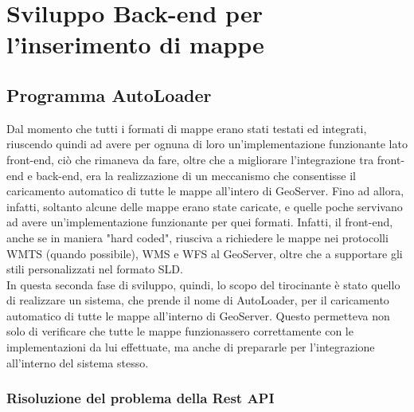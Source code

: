 \chapter{Sviluppo Back-end per l'inserimento di mappe}
\label{cap:chapter6}

\section{Programma AutoLoader}
 
Dal momento che tutti i formati di mappe erano stati testati ed integrati, riuscendo quindi ad avere per ognuna di loro un'implementazione funzionante lato front-end, ciò che rimaneva da fare, oltre che a migliorare l'integrazione tra front-end e back-end, era la realizzazione di un meccanismo che consentisse il caricamento automatico di tutte le mappe all'intero di GeoServer. Fino ad allora, infatti, soltanto alcune delle mappe erano state caricate, e quelle poche servivano ad avere un'implementazione funzionante per quei formati. Infatti, il front-end, anche se in maniera "hard coded", riusciva a richiedere le mappe nei protocolli WMTS (quando possibile), WMS e WFS al GeoServer, oltre che a supportare gli stili personalizzati nel formato SLD. 
\\In questa seconda fase di sviluppo, quindi, lo scopo del tirocinante è stato quello di realizzare un sistema, che prende il nome di AutoLoader, per il caricamento automatico di tutte le mappe all'interno di GeoServer.  Questo permetteva non solo di verificare che tutte le mappe funzionassero correttamente con le implementazioni da lui effettuate, ma anche di prepararle per l'integrazione all'interno del sistema stesso.

\subsection{Risoluzione del problema della Rest API}

